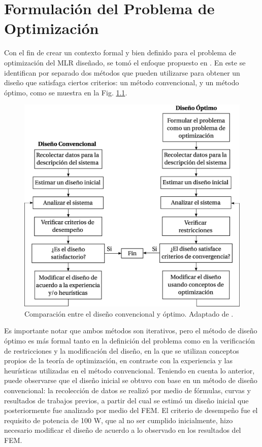 \chapter{Formulación del Problema de Optimización}

Con el fin de crear un contexto formal y bien definido para el problema de optimización del MLR diseñado, se tomó el enfoque propuesto en \cite{arora2012}. En este se identifican por separado dos métodos que pueden utilizarse para obtener un diseño que satisfaga ciertos criterios: un método convencional, y un método óptimo, como se muestra en la Fig. \ref{fig:conventionaloptimumdesign}.

\begin{figure}[t]
\centering
\includegraphics[scale=0.25]{../img/Formulacion_del_Problema_de_Optimizacion/conventionaloptimumdesign.eps}
\caption{Comparación entre el diseño convencional y óptimo. Adaptado de \cite{arora2012}.}
\label{fig:conventionaloptimumdesign}
\end{figure}

Es importante notar que ambos métodos son iterativos, pero el método de diseño óptimo es más formal tanto en la definición del problema como en la verificación de restricciones y la modificación del diseño, en la que se utilizan conceptos propios de la teoría de optimización, en contraste con la experiencia y las heurísticas utilizadas en el método convencional. Teniendo en cuenta lo anterior, puede observarse que el diseño inicial se obtuvo con base en un método de diseño convencional: la recolección de datos se realizó por medio de fórmulas, curvas y resultados de trabajos previos, a partir del cual se estimó un diseño inicial que posteriormente fue analizado por medio del FEM. El criterio de desempeño fue el requisito de potencia de 100 W, que al no ser cumplido inicialmente, hizo necesario modificar el diseño de acuerdo a lo observado en los resultados del FEM.

